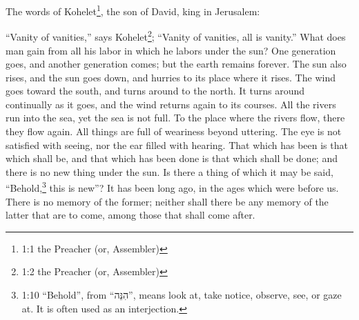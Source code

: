 \newpage
\null
\thispagestyle{empty}
\newpage
{}






\vspace{-1.36in}

\mychapter{} \myverse*{}The words of Kohelet\footnote{1:1 the Preacher (or, Assembler)}, the son of David, king in Jerusalem:

\myverse{}“Vanity of vanities,” says Kohelet\footnote{1:2 the Preacher (or, Assembler)}; “Vanity of vanities, all is vanity.” \myverse{}What does man gain from all his labor in which he labors under the sun? \myverse{}One generation goes, and another generation comes; but the earth remains forever. \myverse{}The sun also rises, and the sun goes down, and hurries to its place where it rises. \myverse{}The wind goes toward the south, and turns around to the north. It turns around continually as it goes, and the wind returns again to its courses. \myverse{}All the rivers run into the sea, yet the sea is not full. To the place where the rivers flow, there they flow again. \myverse{}All things are full of weariness beyond uttering. The eye is not satisfied with seeing, nor the ear filled with hearing. \myverse{}That which has been is that which shall be, and that which has been done is that which shall be done; and there is no new thing under the sun. \myverse{}Is there a thing of which it may be said, “Behold,\footnote{1:10 “Behold”, from “הִנֵּה”, means look at, take notice, observe, see, or gaze at. It is often used as an interjection.} this is new”? It has been long ago, in the ages which were before us. \myverse{}There is no memory of the former; neither shall there be any memory of the latter that are to come, among those that shall come after.


